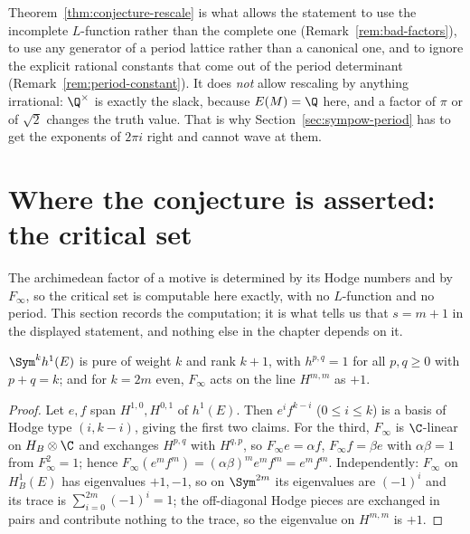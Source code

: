 \begin{remark}
  \label{rem:slack-scope}
  Theorem~\ref{thm:conjecture-rescale} is what allows the statement to use the incomplete
  $L$-function rather than the complete one (Remark~\ref{rem:bad-factors}), to use any
  generator of a period lattice rather than a canonical one, and to ignore the explicit
  rational constants that come out of the period determinant
  (Remark~\ref{rem:period-constant}). It does \emph{not} allow rescaling by anything
  irrational: $\Q^{\times}$ is exactly the slack, because $E(M)=\Q$ here, and a factor of
  $\pi$ or of $\sqrt{2}$ changes the truth value. That is why
  Section~\ref{sec:sympow-period} has to get the exponents of $2\pi i$ right and cannot wave
  at them.
\end{remark}

\section{Where the conjecture is asserted: the critical set}
\label{sec:sympow-critical}

The archimedean factor of a motive is determined by its Hodge numbers and by $F_{\infty}$, so
the critical set is computable here exactly, with no $L$-function and no period. This section
records the computation; it is what tells us that $s = m+1$ in the displayed statement, and
nothing else in the chapter depends on it.

\begin{proposition}
  \label{prop:sympow-hodge}
  $\Sym^{k}h^{1}(E)$ is pure of weight $k$ and rank $k+1$, with $h^{p,q}=1$ for all
  $p,q \geq 0$ with $p+q=k$; and for $k=2m$ even, $F_{\infty}$ acts on the line $H^{m,m}$
  as $+1$.
\end{proposition}
\begin{proof}
  Let $e,f$ span $H^{1,0}, H^{0,1}$ of $h^{1}(E)$. Then $e^{i}f^{k-i}$ ($0 \le i \le k$) is a
  basis of Hodge type $(i,k-i)$, giving the first two claims. For the third, $F_{\infty}$ is
  $\C$-linear on $H_{B}\otimes\C$ and exchanges $H^{p,q}$ with $H^{q,p}$, so
  $F_{\infty}e = \alpha f$, $F_{\infty}f = \beta e$ with $\alpha\beta = 1$ from
  $F_{\infty}^{2}=1$; hence $F_{\infty}(e^{m}f^{m}) = (\alpha\beta)^{m}e^{m}f^{m} = e^{m}f^{m}$.
  Independently: $F_{\infty}$ on $H^{1}_{B}(E)$ has eigenvalues $+1,-1$, so on $\Sym^{2m}$ its
  eigenvalues are $(-1)^{i}$ and its trace is $\sum_{i=0}^{2m}(-1)^{i}=1$; the off-diagonal
  Hodge pieces are exchanged in pairs and contribute nothing to the trace, so the eigenvalue
  on $H^{m,m}$ is $+1$.
\end{proof}

